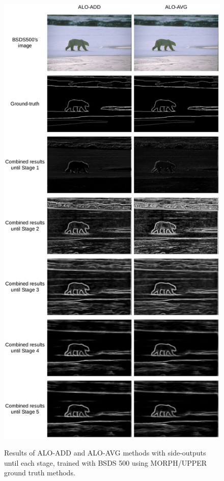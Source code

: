 \begin{figure}%
  \centering
  \caption{Results of ALO-ADD and ALO-AVG methods with side-outputs until each stage, trained with BSDS 500 using MORPH/UPPER ground truth methods.}
  \includegraphics[width=0.8\columnwidth]{../imagens/ilustracoes/cap6_bsds_stage_results.png}
  \sourceOwn
  \label{fig:bsds_stage_results}
\end{figure}


